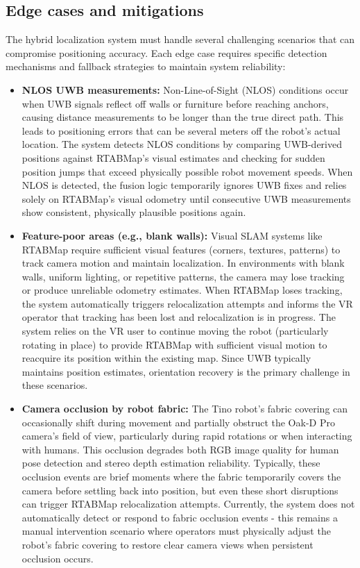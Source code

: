 \subsection*{Edge cases and mitigations}
The hybrid localization system must handle several challenging scenarios that can compromise positioning accuracy. Each edge case requires specific detection mechanisms and fallback strategies to maintain system reliability:

\begin{itemize}
	\item \textbf{NLOS UWB measurements:} Non-Line-of-Sight (NLOS) conditions occur when UWB signals reflect off walls or furniture before reaching anchors, causing distance measurements to be longer than the true direct path. This leads to positioning errors that can be several meters off the robot's actual location. The system detects NLOS conditions by comparing UWB-derived positions against RTABMap's visual estimates and checking for sudden position jumps that exceed physically possible robot movement speeds. When NLOS is detected, the fusion logic temporarily ignores UWB fixes and relies solely on RTABMap's visual odometry until consecutive UWB measurements show consistent, physically plausible positions again.
	
	\item \textbf{Feature-poor areas (e.g., blank walls):} Visual SLAM systems like RTABMap require sufficient visual features (corners, textures, patterns) to track camera motion and maintain localization. In environments with blank walls, uniform lighting, or repetitive patterns, the camera may lose tracking or produce unreliable odometry estimates. When RTABMap loses tracking, the system automatically triggers relocalization attempts and informs the VR operator that tracking has been lost and relocalization is in progress. The system relies on the VR user to continue moving the robot (particularly rotating in place) to provide RTABMap with sufficient visual motion to reacquire its position within the existing map. Since UWB typically maintains position estimates, orientation recovery is the primary challenge in these scenarios.
	
	\item \textbf{Camera occlusion by robot fabric:} The Tino robot's fabric covering can occasionally shift during movement and partially obstruct the Oak-D Pro camera's field of view, particularly during rapid rotations or when interacting with humans. This occlusion degrades both RGB image quality for human pose detection and stereo depth estimation reliability. Typically, these occlusion events are brief moments where the fabric temporarily covers the camera before settling back into position, but even these short disruptions can trigger RTABMap relocalization attempts. Currently, the system does not automatically detect or respond to fabric occlusion events - this remains a manual intervention scenario where operators must physically adjust the robot's fabric covering to restore clear camera views when persistent occlusion occurs.
\end{itemize}

